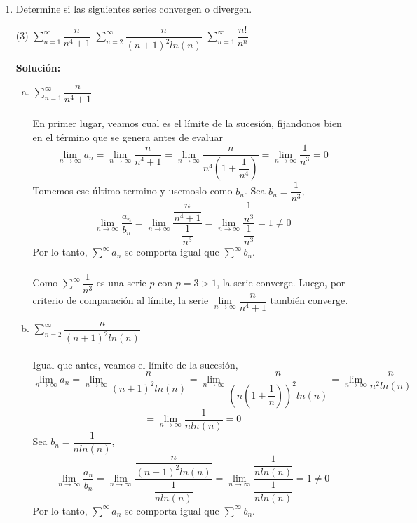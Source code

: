 \documentclass[12pt]{article}
\newenvironment{solucion}
{\begin{mdframed}[backgroundcolor=black!10]
		{\bf Solución:}\\
	}
	{
	\end{mdframed}
}
\newenvironment{preguntas}
{\begin{enumerate}\itemsep12pt
	}
	{
	\end{enumerate}
}
\newcommand{\ra}{\rightarrow}
\begin{document}
\begin{preguntas}
\item Determine si las siguientes series convergen o divergen.
\begin{tasks}(3)
\task $\sum\limits_{n=1}^{\infty}\dfrac{n}{n^4+1}$
\task $\sum\limits_{n=2}^{\infty}\dfrac{n}{(n+1)^2ln(n)}$
\task $\sum\limits_{n=1}^{\infty}\dfrac{n!}{n^n}$
\end{tasks}
\begin{solucion}

\begin{enumerate}[a)]
\item $\sum\limits_{n=1}^{\infty}\dfrac{n}{n^4+1}$\\
			\\
			En primer lugar, veamos cual es el límite de la sucesión, fijandonos bien en el término que se genera antes de evaluar
			$$\lim\limits_{n \ra \infty} a_n
			= \lim\limits_{n \ra \infty} \dfrac{n}{n^4+1}
			= \lim\limits_{n \ra \infty} \dfrac{n}{n^4\left(1+\dfrac{1}{n^4}\right)}
			= \lim\limits_{n \ra \infty} \dfrac{1}{n^3} = 0$$
			Tomemos ese último termino y usemoslo como $b_n$. Sea $b_n = \dfrac{1}{n^3}$,
			$$\lim\limits_{n \ra \infty} \dfrac{a_n}{b_n}
			= \lim\limits_{n \ra \infty} \dfrac{\dfrac{n}{n^4+1}}{\dfrac{1}{n^3}}
			= \lim\limits_{n \ra \infty} \dfrac{\dfrac{1}{n^3}}{\dfrac{1}{n^3}} = 1 \neq 0$$
			Por lo tanto, $\sum\limits^{\infty} a_n$ se comporta igual que $\sum\limits^{\infty} b_n$.\\
			\\
			Como $\sum\limits^{\infty} \dfrac{1}{n^3}$ es una serie-$p$ con $p=3>1$, la serie converge. Luego, por criterio de comparación al límite, la serie $\lim\limits_{n \ra \infty} \dfrac{n}{n^4+1}$ también converge.
\item $\sum\limits_{n=2}^{\infty}\dfrac{n}{(n+1)^2ln(n)}$\\
			\\
			Igual que antes, veamos el límite de la sucesión,
			$$\lim\limits_{n \ra \infty} a_n
			= \lim\limits_{n \ra \infty} \dfrac{n}{(n+1)^2ln(n)}
			= \lim\limits_{n \ra \infty} \dfrac{n}{\left(n\left(1+\dfrac{1}{n}\right)\right)^2ln(n)}
			= \lim\limits_{n \ra \infty} \dfrac{n}{n^2ln(n)}$$
			$$= \lim\limits_{n \ra \infty} \dfrac{1}{nln(n)} = 0$$
			Sea $b_n = \dfrac{1}{nln(n)}$,
			$$\lim\limits_{n \ra \infty} \dfrac{a_n}{b_n}
			=\lim\limits_{n \ra \infty} \dfrac{\dfrac{n}{(n+1)^2ln(n)}}{\dfrac{1}{nln(n)}}
			=\lim\limits_{n \ra \infty} \dfrac{\dfrac{1}{nln(n)}}{\dfrac{1}{nln(n)}} = 1 \neq 0$$
			Por lo tanto, $\sum\limits^{\infty} a_n$ se comporta igual que $\sum\limits^{\infty} b_n$.\\

\end{enumerate}
\end{solucion}
\end{preguntas}
\end{document}
